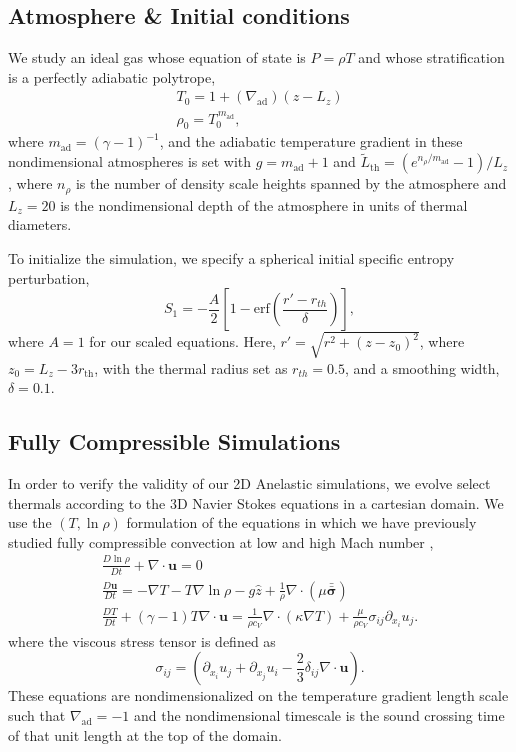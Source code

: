 \documentclass[twocolumn, amsmath, amsfonts, amssymb, trackchanges]{aastex62}
\newcommand{\DivU}{\ensuremath{\nabla\cdot\bm{u}}}
\newcommand{\grad}{\ensuremath{\nabla}}
\newcommand{\lilstressT}{\ensuremath{\bm{\bar{\bar{\sigma}}}}}
\begin{document}
\subsection{Atmosphere \& Initial conditions}
We study an ideal gas whose equation of state is $P = \rho T$ and whose stratification
is a perfectly adiabatic polytrope,
\begin{gather}
T_0 = 1 + (\grad_{\text{ad}})(z - L_z) \\
\rho_0 = T_0^{\,m_{\text{ad}}},
\label{eqn:polytrope}
\end{gather}
where $m_{\text{ad}} = (\gamma-1)^{-1}$, and the adiabatic temperature 
gradient in these nondimensional atmospheres is set with $g = m_{\text{ad}} + 1$
and $\tilde{L}_{\text{th}} = (e^{n_\rho/m_{\text{ad}}} - 1)/L_z$, where
$n_\rho$ is the number of density scale heights spanned by the atmosphere
and $L_z = 20$ is the nondimensional depth of the atmosphere in units of
thermal diameters.
 
To initialize the simulation, we specify a spherical initial specific entropy perturbation,
\begin{equation}
S_1 = - \frac{A}{2}\left[1 - \text{erf}\left(\frac{r' - r_{th}}{\delta}\right)\right],
\label{eqn:thermal_IC}
\end{equation}
where $A = 1$ for our scaled equations.
Here, $r' = \sqrt{r^2 + (z - z_0)^2}$, where $z_0 = L_z - 3r_{\text{th}}$,
with the thermal radius set as $r_{th} = 0.5$, and a smoothing width, $\delta = 0.1$.

\subsection{Fully Compressible Simulations}
In order to verify the validity of our 2D Anelastic simulations, we evolve select
thermals according to the 3D Navier Stokes equations in a cartesian domain. We use
the $(T, \ln\rho)$ formulation of the equations in which we have previously studied fully compressible
convection at low and high Mach number \citep{lecoanet&all2014, anders&brown2017},
\begin{gather}
\frac{D \ln\rho}{Dt} + \DivU = 0 \\
\frac{D \bm{u}}{D t} = -\grad T - T\grad\ln\rho - g\hat{z} + \frac{1}{\rho}\grad\cdot\left(\mu\lilstressT\right) \\
\frac{D T}{Dt} + (\gamma-1)T\DivU  = \frac{1}{\rho c_V}\grad\cdot\left(\kappa \grad T\right) + \frac{\mu}{\rho c_V}\sigma_{ij}\partial_{x_i}u_j.
\end{gather}
where the viscous stress tensor is defined as
\begin{equation}
\sigma_{ij} = \left(\partial_{x_i}u_j + \partial_{x_j}u_i - \frac{2}{3}\delta_{ij}\grad\cdot\bm{u}\right).
\end{equation}
These equations are nondimensionalized on the temperature gradient length scale such that
$\grad_{\text{ad}} = -1$ and the nondimensional timescale is the sound crossing time of that
unit length at the top of the domain.  
\end{document}
